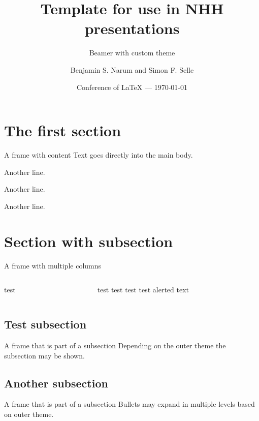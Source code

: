 \documentclass[aspectratio=169]{beamer}
\title[NHH Template]{Template for use in NHH presentations}
\subtitle[]{Beamer with custom theme}
\author[Narum and Selle]{Benjamin S. Narum and Simon F. Selle}
\institute[NHH]{NHH Norwegian School of Economics}
\date[\year]{Conference of \LaTeX{} ---{} \today}
\begin{document}
\section{The first section}

\begin{frame}{A frame with content}
	Text goes directly into the main body.
	
	\vspace{1em}

	Another line.
	
	\vspace{1em}

	Another line.

	\vspace{1em}

	Another line.
\end{frame}

\section{Section with subsection}

\begin{frame}{A frame with multiple columns}

\begin{columns}
\begin{column}{0.49\textwidth}
test
\end{column}
\colsep{}
\begin{column}{0.49\textwidth}
test
\vspace{1em}
test
\vspace{1em}
test
\vspace{1em}
test
\vspace{1em}
\alert{alerted text}
\end{column}
\end{columns}
\end{frame}

\subsection{Test subsection}
\begin{frame}{A frame that is part of a subsection}
	Depending on the outer theme the subsection may be shown.
\end{frame}

\subsection{Another subsection}
\begin{frame}{A frame that is part of a subsection}
	Bullets may expand in multiple levels based on outer theme.
\end{frame}
\end{document}

